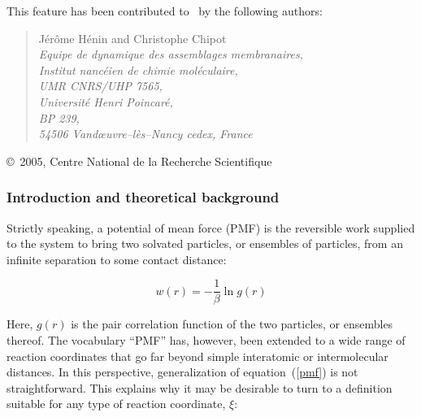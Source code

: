 




This feature has been contributed to \NAMD\ by the following authors:

\begin{quote}
   J\'er\^ome H\'enin and Christophe Chipot           \\[0.4cm]
   {\it Equipe de dynamique des assemblages membranaires, }\\
   {\it Institut nanc\'eien de chimie mol\'eculaire,      }\\
   {\it UMR CNRS/UHP 7565,                                }\\
   {\it Universit\'e Henri Poincar\'e,                    }\\
   {\it BP 239,                                           }\\
   {\it 54506 Vand\oe uvre--l\`es--Nancy cedex, France    }
\end{quote}

\copyright~2005, {\sc Centre National de la Recherche Scientifique}





\subsubsection{Introduction and theoretical background}


Strictly speaking, a potential of mean force (PMF) is the
reversible work supplied to the system to bring two solvated
particles, or ensembles of particles, from an infinite separation
to some contact distance:~\cite{chan_87_1}


\begin{equation}
\label{pmf}
w(r) = -\frac{1}{\beta} \ln g(r)
\end{equation}


Here, $g(r)$ is the pair correlation function of the
two particles, or ensembles thereof.
The vocabulary ``PMF'' has, however, been extended
to a wide range of reaction coordinates that go far
beyond simple interatomic or intermolecular distances.
In this perspective, generalization of equation~({\ref{pmf}})
is not straightforward. This explains why it may be
desirable to turn to a definition suitable for any
type of reaction coordinate, $\xi$:


